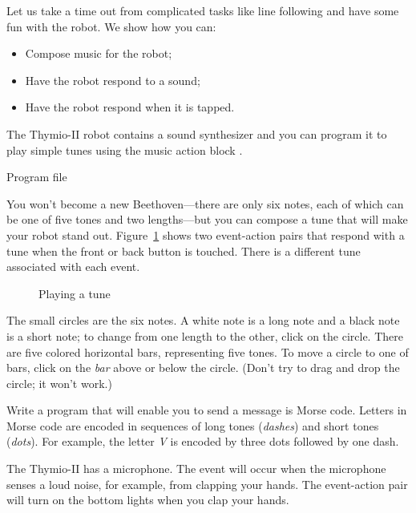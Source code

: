 \label{ch.bells}

Let us take a time out from complicated tasks like line following and
have some fun with the robot. We show how you can:
\begin{itemize}
\item Compose music for the robot;
\item Have the robot respond to a sound;
\item Have the robot respond when it is tapped.
\end{itemize}


The Thymio-II robot contains a sound synthesizer and you can program it
to play simple tunes using the music action block .


{\raggedleft \hfill Program file }

You won't become a new Beethoven---there are only six notes, each of
which can be one of five tones and two lengths---but you can compose a
tune that will make your robot stand out. Figure~\ref{fig.music} shows
two event-action pairs that respond with a tune when the front or back
button is touched. There is a different tune associated with each event.

\begin{figure}
\begin{center}
\caption{Playing a tune}\label{fig.music}
\end{center}
\end{figure}

The small circles are the six notes. A white note is a long note
and a black note is a short note; to change from one length to the
other, click on the circle. There are five colored horizontal bars,
representing five tones. To move a circle to one of bars, click on the
\emph{bar} above or below the circle. (Don't try to drag and drop the
circle; it won't work.)

Write a program that will enable you to send a message is Morse code.
Letters in Morse code are encoded in sequences of long tones
(\emph{dashes}) and short tones (\emph{dots}). For example, the letter
\emph{V} is encoded by three dots followed by one dash.



The Thymio-II has a microphone. The event  will occur
when the microphone senses a loud noise, for example, from clapping your
hands. The event-action pair  will turn on the bottom lights
when you clap your hands.

